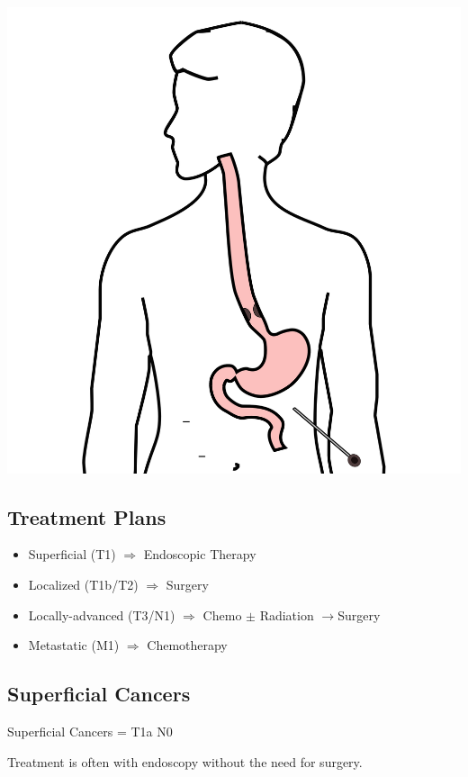 \documentclass[
  letterpaper,
  DIV=11,
  numbers=noendperiod]{scrartcl}
\providecommand{\tightlist}{%
  \setlength{\itemsep}{0pt}\setlength{\parskip}{0pt}}\usepackage{longtable,booktabs,array}
\begin{document}
\includegraphics{christmas2004_files/mediabag/Eso_Laparoscopy.png}

\subsection{Treatment Plans}\label{treatment-plans}

\begin{itemize}
\tightlist
\item
  Superficial (T1) \(\Rightarrow\) Endoscopic Therapy
\item
  Localized (T1b/T2) \(\Rightarrow\) Surgery
\item
  Locally-advanced (T3/N1) \(\Rightarrow\) Chemo \(\pm\) Radiation
  \(\rightarrow\)Surgery
\item
  Metastatic (M1) \(\Rightarrow\) Chemotherapy
\end{itemize}

\subsection{Superficial Cancers}\label{superficial-cancers}

Superficial Cancers = T1a N0

Treatment is often with endoscopy without the need for surgery.
\end{document}
